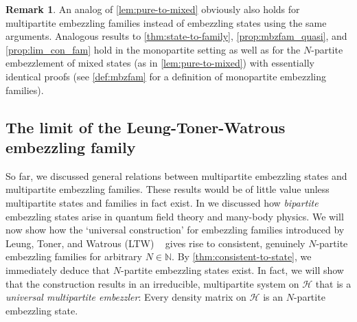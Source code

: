 \documentclass[a4paper, 10pt, onecolumn, accepted=2025-07-22]{quantumarticle}
\theoremstyle{definition}
\newtheorem{remark}[theorem]{Remark}
\newcommand{\mc}{\mathcal}
\def\H{{\mc H}}
\def\NN{{\mathbb N}}
\newcommand*{\1}{\text{\usefont{U}{bbold}{m}{n}1}}
\begin{document}
\begin{remark}
 An analog of \cref{lem:pure-to-mixed} obviously also holds for multipartite embezzling families instead of embezzling states using the same arguments.  Analogous results to \cref{thm:state-to-family}, \cref{prop:mbzfam_quasi}, and \cref{prop:lim_con_fam} hold in the monopartite setting as well as for the $N$-partite embezzlement of mixed states (as in \cref{lem:pure-to-mixed}) with essentially identical proofs (see \cref{def:mbzfam} for a definition of monopartite embezzling families).
\end{remark}


\subsection{The limit of the Leung-Toner-Watrous embezzling family}\label{sec:LTW}

So far, we discussed 
general relations between multipartite embezzling states and multipartite embezzling families. 
These results would be of little value unless multipartite states and families in fact exist. 
In \cite{long_paper,short_paper,van_luijk_critical_2024} we discussed how \emph{bipartite} embezzling states arise in quantum field theory and many-body physics. 
We will now show how the `universal construction' for embezzling families introduced by Leung, Toner, and Watrous (LTW) \ \cite{Leung2013coherent} gives rise to consistent, genuinely $N$-partite embezzling families for arbitrary $N\in \NN$. By \cref{thm:consistent-to-state}, we immediately deduce that $N$-partite embezzling states exist. In fact, we will show that the construction results in an irreducible, multipartite system on $\H$ that is a \emph{universal multipartite embezzler}: Every density matrix on $\H$ is an $N$-partite embezzling state.
\end{document}
